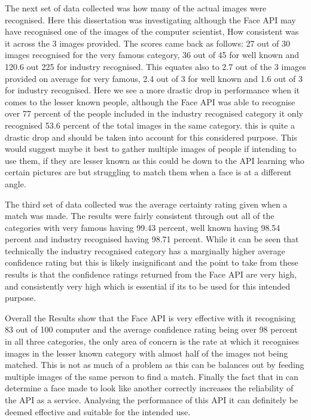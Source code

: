 \documentclass[12pt,a4paper]{article}
\begin{document}
The next set of data collected was how many of the actual images were recognised. Here this dissertation was investigating although the Face API may have recognised one of the images of the computer scientist, How consistent was it across the 3 images provided. The scores came back as follows: 27 out of 30 images recognised for the very famous category, 36 out of 45 for well known and 120.6 out 225 for industry recognised. This equates also to 2.7 out of the 3 images provided on average for very famous, 2.4 out of 3 for well known and 1.6 out of 3 for industry recognised. Here we see a more drastic drop in performance when it comes to the lesser known people, although the Face API was able to recognise over 77 percent of the people included in the industry recognised category it only recognised 53.6 percent of the total images in the same category. this is quite a drastic drop and should be taken into account for this considered purpose. This would suggest maybe it best to gather multiple images of people if intending to use them, if they are lesser known as this could be down to the API learning who certain pictures are but struggling to match them when a face is at a different angle.  

The third set of data collected was the average certainty rating given when a match was made. The results were fairly consistent through out all of the categories with very famous having 99.43 percent, well known having 98.54 percent and industry recognised having 98.71 percent. While it can be seen that technically the industry recognised category has a marginally higher average confidence rating but this is likely insignificant and the point to take from these results is that the confidence ratings returned from the Face API are very high, and consistently very high which is essential if its to be used for this intended purpose. 

Overall the Results show that the Face API is very effective with it recognising 83 out of 100 computer and the average confidence rating being over 98 percent in all three categories, the only area of concern is the rate at which it recognises images in the lesser known category with almost half of the images not being matched. This is not as much of a problem as this can be balances out by feeding multiple images of the same person to find a match. Finally the fact that in can determine a face made to look like another correctly increases the reliability of the API as a service.  Analysing the performance of this API it can definitely be deemed effective and suitable for the intended use.  
\end{document}
